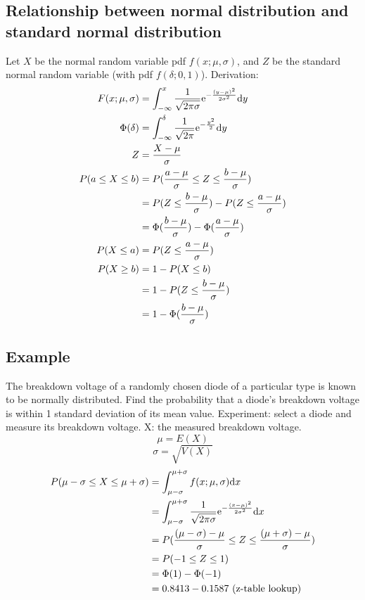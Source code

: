 \documentclass{math}
\begin{document}
\subsection*{Relationship between normal distribution and standard normal
             distribution}
Let \( X \) be the normal random variable pdf \( f(x;\mu,\sigma) \), and
\( Z \) be the standard normal random variable (with pdf \( f(\delta;0,1) \)).
Derivation:
\begin{align*}
  F(x;\mu,\sigma) &= \int_{-\infty}^{x}\frac{1}{\sqrt{2\pi\sigma}}
    \mathrm{e}^{-\frac{(y-\mu)^{2}}{2\sigma^{2}}}\mathrm{d}{y} \\
  \Phi(\delta) &= \int_{-\infty}^{\delta}\frac{1}{\sqrt{2\pi}}
    \mathrm{e}^{-\frac{y^{2}}{2}}\mathrm{d}{y} \\
  Z &= \frac{X-\mu}{\sigma} \\
  P(a\leq X\leq b) &= P(\frac{a-\mu}{\sigma}\leq Z\leq\frac{b-\mu}{\sigma}) \\
  &= P(Z\leq\frac{b-\mu}{\sigma})-P(Z\leq\frac{a-\mu}{\sigma}) \\
  &= \Phi(\frac{b-\mu}{\sigma})-\Phi(\frac{a-\mu}{\sigma}) \\
  P(X\leq a) &= P(Z\leq\frac{a-\mu}{\sigma}) \\
  P(X\geq b) &= 1-P(X\leq b) \\
  &= 1-P(Z\leq\frac{b-\mu}{\sigma}) \\
  &= 1-\Phi(\frac{b-\mu}{\sigma})
\end{align*}

\subsection*{Example}
The breakdown voltage of a randomly chosen diode of a particular type is known
to be normally distributed. Find the probability that a diode's breakdown
voltage is within 1 standard deviation of its mean value. Experiment: select
a diode and measure its breakdown voltage. X: the measured breakdown voltage.
\[ \mu = E(X) \]
\[ \sigma = \sqrt{V(X)} \]
\begin{align*}
  P(\mu-\sigma\leq X\leq\mu+\sigma) &= \int_{\mu-\sigma}^{\mu+\sigma}
    f(x;\mu,\sigma)\mathrm{d}{x} \\
  &= \int_{\mu-\sigma}^{\mu+\sigma}\frac{1}{\sqrt{2\pi\sigma}}
    \mathrm{e}^{-\frac{(x-\mu)^{2}}{2\sigma^{2}}}\mathrm{d}{x} \\
  &= P(\frac{(\mu-\sigma)-\mu}{\sigma}\leq
    Z\leq\frac{(\mu+\sigma)-\mu}{\sigma}) \\
  &= P(-1\leq Z\leq1) \\
  &= \Phi(1)-\Phi(-1) \\
  &= 0.8413-0.1587 \textrm{  (z-table lookup)}
\end{align*}
\end{document}

